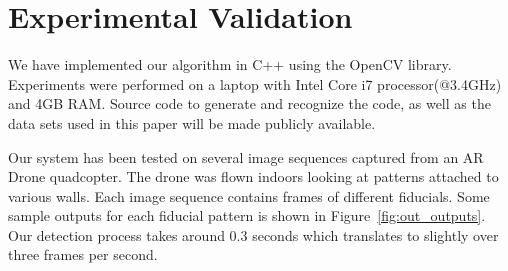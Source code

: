 \documentclass[10pt,twocolumn,letterpaper]{article}
\begin{document}

\section{Experimental Validation}

We have implemented our algorithm in C++ using the OpenCV library.
Experiments were performed on a laptop with Intel Core i7
processor(@3.4GHz) and 4GB RAM.  Source code to generate and recognize
the code, as well as the data sets used in this paper will be made
publicly available.

Our system has been tested on several image sequences captured from an
AR Drone quadcopter.  The drone was flown indoors looking at patterns
attached to various walls. Each image sequence contains frames of
different fiducials. Some sample outputs for each fiducial pattern
is shown in Figure~\ref{fig:out_outputs}. Our detection process takes
around 0.3 seconds which translates to slightly over three frames per
second.
\end{document}
